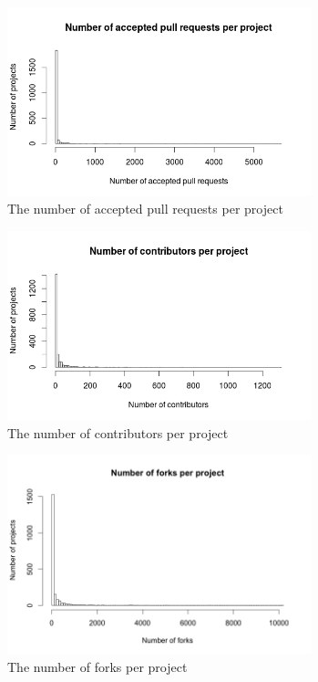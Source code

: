 	    \begin{figure}
	        \includegraphics[width=250pt]{figures/nr-of-accepted-pull-requests-per-project}
	        \caption{The number of accepted pull requests per project}
	        \label{fig:accepted-pull-plot}
	    \end{figure}

	    \begin{figure}
	        \includegraphics[width=250pt]{figures/nr-of-contributors-per-project}
	        \caption{The number of contributors per project}
	        \label{fig:nr-contributors-plot}
	    \end{figure}

	    \begin{figure}
	        \includegraphics[width=250pt]{figures/number-of-forks-per-project}
	        \caption{The number of forks per project}
	        \label{fig:nr-forks-plot}
	    \end{figure}

